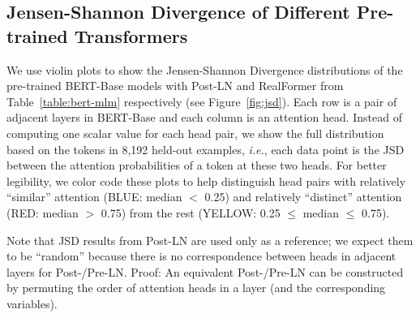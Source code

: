 \documentclass[11pt,a4paper]{article}
\begin{document}
\subsection{Jensen-Shannon Divergence of Different Pre-trained Transformers} \label{sec:appendix:jsd}

We use violin plots to show the Jensen-Shannon Divergence distributions of the pre-trained BERT-Base models with Post-LN and RealFormer from Table~\ref{table:bert-mlm} respectively (see Figure~\ref{fig:jsd}). 
Each row is a pair of adjacent layers in BERT-Base and each column is an attention head. 
Instead of computing one scalar value for each head pair, we show the full distribution based on the tokens in 8,192 held-out examples, \emph{i.e.}, each data point is the JSD between the attention probabilities of a token at these two heads.
For better legibility, we color code these plots to help distinguish head pairs with relatively ``similar'' attention (BLUE: median $<$ 0.25) and relatively ``distinct'' attention (RED: median $>$ 0.75) from the rest (YELLOW: 0.25 $\le$ median $\le$ 0.75).

Note that JSD results from Post-LN are used only as a reference; we expect them to be ``random'' because there is no correspondence between heads in adjacent layers for Post-/Pre-LN. Proof: An equivalent Post-/Pre-LN can be constructed by permuting the order of attention heads in a layer (and the corresponding variables).



\begin{figure*}[!h]
\centering
{}
\caption{Distribution of Jensen-Shannon Divergence (JSD) of attention probabilities in (vertically) adjacent attention heads, \emph{i.e.}, $\text{JSD}(\text{head}^L_i, \text{head}^{L-1}_i)$. Based on 8,192 held-out examples using the pre-trained BERT-Base with \textbf{RealFormer} and \textbf{Post-LN} Transformer respectively (see Section~\ref{sec:pre-train}). Distributions are color-coded based on the median of JSDs: RED (median $>$ 0.75), YELLOW (0.25 $\le$ median $\le$ 0.75), BLUE (median $<$ 0.25). \emph{I.e.}, colder color means more ``similar'' attention heads across adjacent layers.}
\label{fig:jsd}
\end{figure*}
\end{document}

